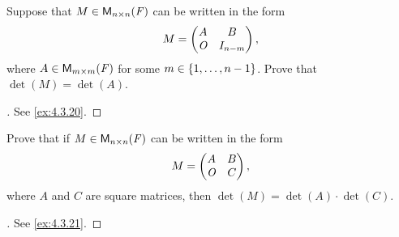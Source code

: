 \exercisesection

\setcounter{ex}{4}
\begin{ex}\label{ex:4.4.5}
  Suppose that \(M \in \ms[n][n][\F]\) can be written in the form
  \[
    M = \begin{pmatrix}
      A   & B         \\
      \mathit{O} & I_{n - m}
    \end{pmatrix},
  \]
  where \(A \in \ms[m][m][\F]\) for some \(m \in \left\lbrace1, \dots, n - 1\right\rbrace\).
  Prove that \(\det(M) = \det(A)\).
\end{ex}

\begin{proof}[]
  See \cref{ex:4.3.20}.
\end{proof}

\begin{ex}\label{ex:4.4.6}
  Prove that if \(M \in \ms[n][n][\F]\) can be written in the form
  \[
    M = \begin{pmatrix}
      A   & B \\
      \mathit{O} & C
    \end{pmatrix},
  \]
  where \(A\) and \(C\) are square matrices, then \(\det(M) = \det(A) \cdot \det(C)\).
\end{ex}

\begin{proof}[]
  See \cref{ex:4.3.21}.
\end{proof}
